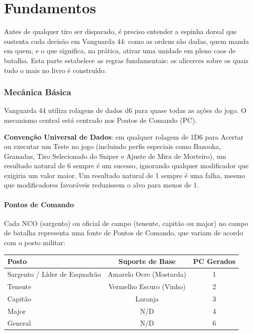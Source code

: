 \part{Fundamentos}

Antes de qualquer tiro ser disparado, é preciso entender a espinha dorsal que sustenta cada decisão em Vanguarda 44: como as ordens são dadas, quem manda em quem, e o que significa, na prática, ativar uma unidade em pleno caos de batalha. Esta parte estabelece as regras fundamentais: os alicerces sobre os quais tudo o mais no livro é construído.

\section{Mecânica Básica}

Vanguarda 44 utiliza rolagens de dados d6 para quase todas as ações do jogo. O mecanismo central está centrado nos Pontos de Comando (PC).

\textbf{Convenção Universal de Dados}: em qualquer rolagem de 1D6 para Acertar ou executar um Teste no jogo (incluindo perfis especiais como Bazooka, Granadas, Tiro Selecionado do Sniper e Ajuste de Mira de Morteiro), um resultado natural de 6 sempre é um sucesso, ignorando qualquer modificador que exigiria um valor maior. Um resultado natural de 1 sempre é uma falha, mesmo que modificadores favoráveis reduzissem o alvo para menos de 1.

\subsection{Pontos de Comando}

Cada NCO (sargento) ou oficial de campo (tenente, capitão ou major) no campo de batalha representa uma fonte de Pontos de Comando, que variam de acordo com o posto militar:

\begin{center}
\begin{tabular}{lcc}
\toprule
Posto & Suporte de Base & PC Gerados \\
\midrule
Sargento / Líder de Esquadrão & Amarelo Ocre (Mostarda) & 1 \\
Tenente & Vermelho Escuro (Vinho) & 2 \\
Capitão & Laranja & 3 \\
Major & N/D & 4 \\
General & N/D & 6 \\
\bottomrule
\end{tabular}
\end{center}


